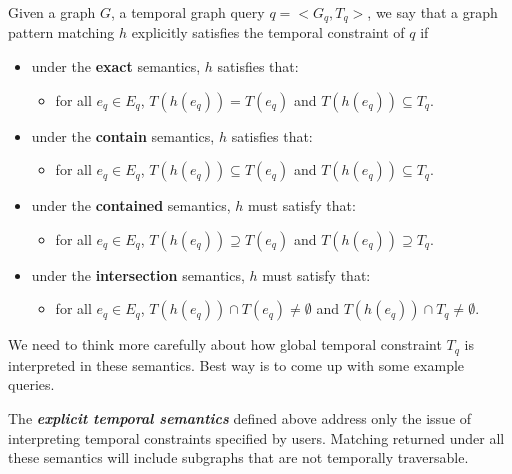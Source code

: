\begin{defn}
\label{explicit-temp-semantics}
Given a graph $G$, a temporal graph query $q= <G_q, T_q>$, we say that a graph
pattern matching $h$ explicitly satisfies the temporal constraint of $q$ if
\begin{itemize}
	\item under the {\bf exact} semantics, $h$ satisfies that:
	\begin{itemize}
		\item for all $e_q \in E_q$, $T(h(e_q)) = T(e_q)$ and $T(h(e_q))
                  \subseteq T_q$.
	\end{itemize}

	\item under the {\bf contain} semantics, $h$ satisfies that:
	\begin{itemize}
		\item for all $e_q \in E_q$, $T(h(e_q)) \subseteq T(e_q)$ and
                  $T(h(e_q)) \subseteq T_q$.
	\end{itemize}

	\item under the {\bf contained} semantics, $h$ must satisfy that:
	\begin{itemize}
		\item for all $e_q \in E_q$, $T(h(e_q)) \supseteq T(e_q)$ and
                  $T(h(e_q)) \supseteq T_q$.
	\end{itemize}

	\item under the {\bf intersection} semantics, $h$ must satisfy that:
	\begin{itemize}
		\item for all $e_q \in E_q$, $T(h(e_q)) \cap T(e_q) \not=
                  \emptyset $ and $T(h(e_q)) \cap T_q \not= \emptyset$.
	\end{itemize}

\end{itemize}
\end{defn}

 We need to think more carefully about how global temporal
constraint $T_q$ is interpreted in these semantics. Best way is to come up with
some example queries.

\SmallSpace

The {\bf {\em explicit temporal semantics}} defined above address only the issue
of interpreting temporal constraints specified by users. Matching returned under
all these semantics will include subgraphs that are not temporally traversable.

